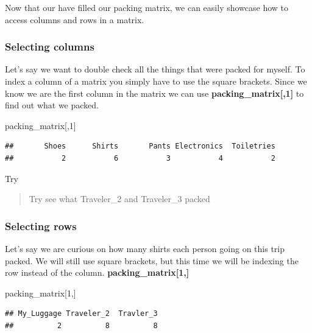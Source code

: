 \documentclass[
]{book}
\newenvironment{Shaded}{\begin{snugshade}}{\end{snugshade}}
\newcommand{\DecValTok}[1]{\textcolor[rgb]{0.00,0.00,0.81}{#1}}
\newcommand{\NormalTok}[1]{#1}
\begin{document}
Now that our have filled our packing matrix, we can easily showcase how to access columns and rows in a matrix.

\hypertarget{selecting-columns}{%
\subsubsection{Selecting columns}\label{selecting-columns}}

Let's say we want to double check all the things that were packed for myself. To index a column of a matrix you simply have to use the square brackets. Since we know we are the first column in the matrix we can use \textbf{packing\_matrix{[},1{]}} to find out what we packed.

\begin{Shaded}
\begin{Highlighting}[]
\NormalTok{packing\_matrix[,}\DecValTok{1}\NormalTok{]}
\end{Highlighting}
\end{Shaded}

\begin{verbatim}
##       Shoes      Shirts       Pants Electronics  Toiletries 
##           2           6           3           4           2
\end{verbatim}

Try

\begin{quote}
Try see what Traveler\_2 and Traveler\_3 packed
\end{quote}

\hypertarget{selecting-rows}{%
\subsubsection{Selecting rows}\label{selecting-rows}}

Let's say we are curious on how many shirts each person going on this trip packed. We will still use square brackets, but this time we will be indexing the row instead of the column. \textbf{packing\_matrix{[}1,{]}}

\begin{Shaded}
\begin{Highlighting}[]
\NormalTok{packing\_matrix[}\DecValTok{1}\NormalTok{,]}
\end{Highlighting}
\end{Shaded}

\begin{verbatim}
## My_Luggage Traveler_2  Travler_3 
##          2          8          8
\end{verbatim}
\end{document}
